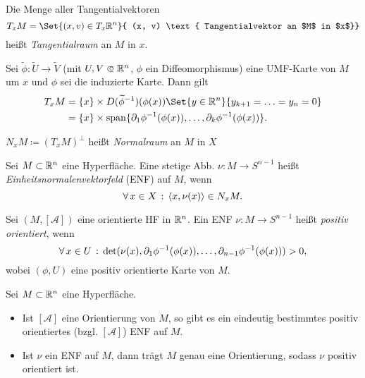 \documentclass{cheat-sheet}
\newcommand{\Atlas}{\mathcal{A}} %
\theoremstyle{definition}
\newcommand{\scp}[2]{\langle #1 , #2 \rangle} %
\begin{document}
\begin{defn}
  Die Menge aller Tangentialvektoren
  \[ T_x M = \Set{ (x, v) \in T_x \R^n }{ (x, v) \text{ Tangentialvektor an $M$ in $x$}} \]
  heißt \emph{Tangentialraum} an $M$ in $x$.
\end{defn}

\begin{prop}
  Sei $\widetilde{\phi} : \widetilde{U} \to \widetilde{V}$ (mit $U, V \opn \R^n$, $\phi$ ein Diffeomorphismus) eine UMF-Karte von $M$ um $x$ und $\phi$ sei die induzierte Karte. Dann gilt
  \begin{align*}
    T_x M &= \{ x \} \times D (\widetilde{\phi}^{-1}) (\phi(x)) \Set{ y \in \R^n }{ y_{k+1} = \ldots = y_n = 0 } \\
    &= \{ x \} \times \mathrm{span} \{ \partial_1 \phi^{-1} (\phi(x)), \ldots, \partial_k \phi^{-1} (\phi(x)) \}.
  \end{align*}
\end{prop}


\begin{defn}
  $N_x M \coloneqq (T_x M)^\perp$ heißt \emph{Normalraum} an $M$ in $X$
\end{defn}



\begin{defn}
  Sei $M \subset \mathbb{R}^n$ eine Hyperfläche. Eine stetige Abb. $\nu : M \!\to\! S^{n {-} 1}$ heißt \emph{Einheitsnormalenvektorfeld} (ENF) auf $M$, wenn
  \[ \fa{x \in X} \scp{x}{\nu(x)} \in N_x M. \]
\end{defn}

\begin{defn}
  Sei $(M, [\Atlas])$ eine orientierte HF in $\mathbb{R}^n$. Ein ENF $\nu : M \to S^{n {-} 1}$ heißt \emph{positiv orientiert}, wenn
  \[ \forall \, {x \in U} \,:\, \det(\nu(x), \partial_1 \phi^{-1}(\phi(x)), \ldots, \partial_{n {-} 1} \phi^{-1} (\phi(x))) > 0, \]
  wobei $(\phi, U)$ eine positiv orientierte Karte von $M$.
\end{defn}

\begin{satz}
  Sei $M \subset \mathbb{R}^n$ eine Hyperfläche.
  \begin{itemize}
    \item Ist $[\Atlas]$ eine Orientierung von $M$, so gibt es ein eindeutig bestimmtes positiv orientiertes (bzgl. $[\Atlas]$) ENF auf $M$.
    \item Ist $\nu$ ein ENF auf $M$, dann trägt $M$ genau eine Orientierung, sodass $\nu$ positiv orientiert ist.
  \end{itemize}
\end{satz}
\end{document}
